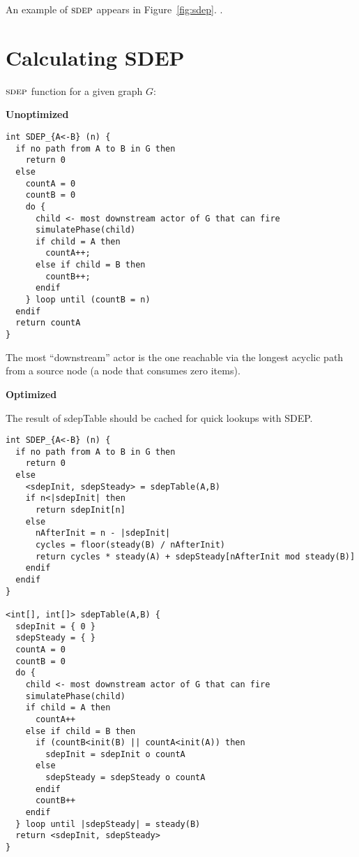 An example of $\textsc{sdep}$ appears in
Figure~\ref{fig:sdep}. .

\section{Calculating SDEP}

$\textsc{sdep}$ function for a given graph $G$:

{\bf Unoptimized}

{\scriptsize
\begin{verbatim}
int SDEP_{A<-B} (n) {
  if no path from A to B in G then
    return 0
  else 
    countA = 0
    countB = 0
    do {
      child <- most downstream actor of G that can fire
      simulatePhase(child)
      if child = A then
        countA++;
      else if child = B then
        countB++;
      endif
    } loop until (countB = n)
  endif
  return countA
}
\end{verbatim}}

The most ``downstream'' actor is the one reachable via the longest
acyclic path from a source node (a node that consumes zero items).

{\bf Optimized}

The result of sdepTable should be cached for quick lookups with SDEP.

{\scriptsize
\begin{verbatim}
int SDEP_{A<-B} (n) {
  if no path from A to B in G then
    return 0
  else
    <sdepInit, sdepSteady> = sdepTable(A,B)
    if n<|sdepInit| then
      return sdepInit[n]
    else
      nAfterInit = n - |sdepInit|
      cycles = floor(steady(B) / nAfterInit)
      return cycles * steady(A) + sdepSteady[nAfterInit mod steady(B)]
    endif
  endif
}

<int[], int[]> sdepTable(A,B) {
  sdepInit = { 0 }
  sdepSteady = { }
  countA = 0
  countB = 0
  do {
    child <- most downstream actor of G that can fire
    simulatePhase(child)
    if child = A then
      countA++
    else if child = B then
      if (countB<init(B) || countA<init(A)) then
        sdepInit = sdepInit o countA
      else
        sdepSteady = sdepSteady o countA
      endif
      countB++
    endif
  } loop until |sdepSteady| = steady(B)
  return <sdepInit, sdepSteady>
}
\end{verbatim}}
